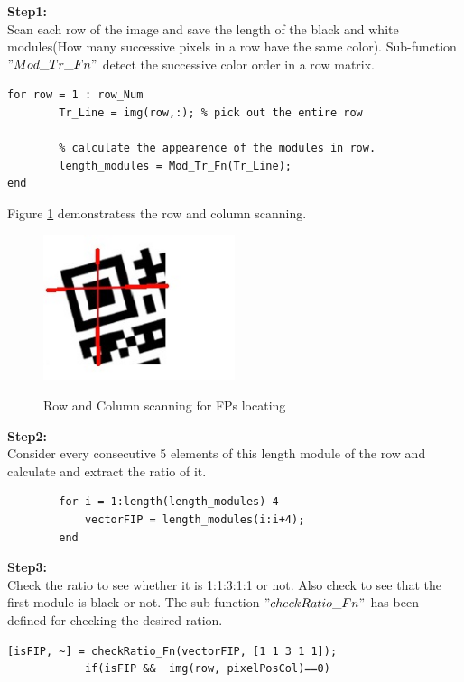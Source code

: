 \textbf{Step1:}\\ Scan each row of the image and save the length of the black and white modules(How many successive pixels in a row have the same color). Sub-function $"Mod\_Tr\_Fn"$ detect the successive color order in a row matrix.

\begin{lstlisting}
for row = 1 : row_Num
        Tr_Line = img(row,:); % pick out the entire row
        
        % calculate the appearence of the modules in row.
        length_modules = Mod_Tr_Fn(Tr_Line);
end
\end{lstlisting}

Figure \ref{fig:3.1} demonstratess the row and column scanning.

\begin{figure}[H]
  \caption{Row and Column scanning for FPs locating}
  \centering
    \includegraphics[width=0.5\textwidth]{figures/rowcolumnscan.jpg}
    \label{fig:3.1}
\end{figure}

\textbf{Step2:}\\ Consider every consecutive 5 elements of this length module of the row and calculate and extract the ratio of it.

\begin{lstlisting}
        for i = 1:length(length_modules)-4  
            vectorFIP = length_modules(i:i+4);
        end
\end{lstlisting}

\textbf{Step3:}\\ Check the ratio to see whether it is 1:1:3:1:1 or not. Also check to see that the first module is black or not. The sub-function $"checkRatio\_Fn"$ has been defined for checking the desired ration.

\begin{lstlisting}
[isFIP, ~] = checkRatio_Fn(vectorFIP, [1 1 3 1 1]);
            if(isFIP &&  img(row, pixelPosCol)==0)
\end{lstlisting}

